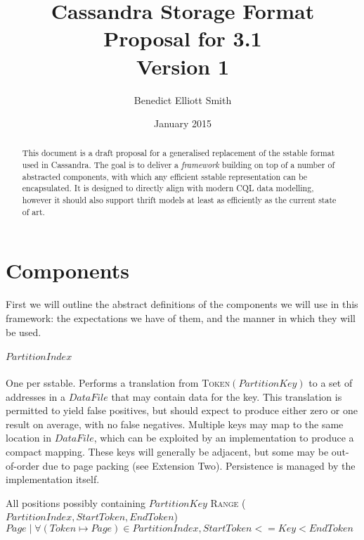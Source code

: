 \documentclass[fleqn]{article}
\title{Cassandra Storage Format\\Proposal for 3.1\\Version 1}
\author{Benedict Elliott Smith}
\date{January 2015}
\begin{document}
\maketitle

\begin{abstract}
This document is a draft proposal for a generalised replacement of the sstable format used in Cassandra.
The goal is to deliver a \textit{framework} building on top of a number of abstracted components, with which
any efficient sstable representation can be encapsulated. It is designed to directly align with modern CQL
data modelling, however it should also support thrift models at least as efficiently as the current state of art.
\end{abstract}

\small

\section{Components}
First we will outline the abstract definitions of the components we will use in this framework: the
expectations we have of them, and the manner in which they will be used.
\subparagraph{$PartitionIndex$}
\subparagraph{}
    One per sstable.
    Performs a translation from \textsc{Token}$(PartitionKey)$ to a set of addresses in a $DataFile$ that may contain
    data for the key. This translation is permitted to yield false positives, but should expect to 
    produce either zero or one result on average, with no false negatives. Multiple keys may map to the 
    same location in $DataFile$, which can be exploited by an implementation to produce a compact mapping. 
    These keys will generally be adjacent, but some may be out-of-order due to page packing (see Extension Two). 
    Persistence is managed by the implementation itself.
    \\
    \begin{algorithmic}[2]
    \scriptsize
    \Statex \Return All positions possibly containing $PartitionKey$
    \EndFunction
     \textsc{Range} ({$PartitionIndex, StartToken, EndToken$})
    \Statex \Return ${Page \mid \forall (Token \mapsto Page) \in PartitionIndex, StartToken <= Key < EndToken }$
    \end{algorithmic}
\end{document}
